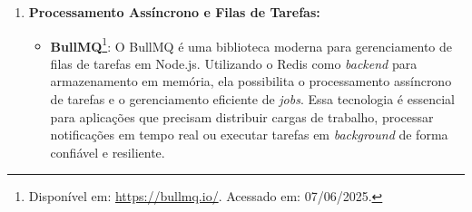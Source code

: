 \begin{enumerate}
\begin{itemize}
            
            \item \textbf{Github}\footnote{Disponível em: \url{https://docs.github.com/pt}. Acessado em: 06/06/2025.}: 
                O GitHub é uma plataforma de hospedagem e colaboração baseada em Git para desenvolvimento de \textit{software}, servindo como ambiente centralizado para gerenciamento de projetos. Oferece ferramentas integradas para controle de versão, revisão de código, automação de \textit{workflows} e gestão de tarefas, sendo amplamente utilizado para projetos \textit{open-source} e colaboração em equipe.
            \par\vspace{0.75\baselineskip}
        \end{itemize}

        \item \textbf{Processamento Assíncrono e Filas de Tarefas:}  
        \begin{itemize}
            \item \textbf{BullMQ}\footnote{Disponível em: \url{https://bullmq.io/}. Acessado em: 07/06/2025.}: 
                O BullMQ é uma biblioteca moderna para gerenciamento de filas de tarefas em Node.js. Utilizando o Redis como \textit{backend} para armazenamento em memória, ela possibilita o processamento assíncrono de tarefas e o gerenciamento eficiente de \textit{jobs}. Essa tecnologia é essencial para aplicações que precisam distribuir cargas de trabalho, processar notificações em tempo real ou executar tarefas em \textit{background} de forma confiável e resiliente. %
            \par\vspace{0.25\baselineskip}
            

\end{itemize}
\end{enumerate}
